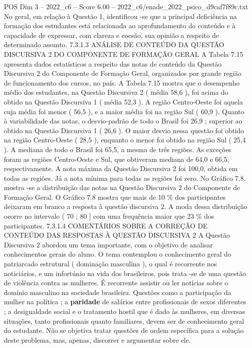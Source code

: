 \begin{textsample}{POS Dim 3 – 2022\_c6 – Score 6.00 – 2022\_c6/enade\_2022\_psico\_d9caf7f89c.txt}
No geral, em relação à Questão 1, identificou -se que a principal deficiência na formação dos estudantes está relacionada ao aprofundamento do conteúdo e à capacidade de expressar, com clareza e coesão, sua opinião a respeito de determinado assunto. 7.3.1.3 ANÁLISE DE CONTEÚDO DA QUESTÃO DISCURSIVA 2 DO COMPONENTE DE FORMAÇÃO GERAL A Tabela 7.15 apresenta dados estatísticos a respeito das notas de conteúdo da Questão Discursiva 2 do Componente de Formação Geral, organizados por grande região de funcionamento dos cursos, no país.
A Tabela 7.15 mostra que o desempenho médio dos estudantes, na Questão Discursiva 2 ( média 58,6 ), foi acima do obtido na Questão Discursiva 1 ( média 52,3 ).
A região Centro-Oeste foi aquela cuja média foi menor ( 56,5 ), e a maior média foi na região Sul ( 60,9 ).
Quanto à variabilidade das notas, o desvio-padrão de todo o Brasil foi 26,9 ; superior ao obtido na Questão Discursiva 1 ( 26,6 ).
O maior desvio nessa questão foi obtido na região Centro-Oeste ( 28,5 ), enquanto o menor foi obtido na região Sul ( 25,4 ).
A mediana de todo o Brasil foi 65,5, a mesma de três regiões.
As exceções foram as regiões Centro-Oeste e Sul, que obtiveram mediana de 64,0 e 66,5, respectivamente.
A nota máxima da Questão Discursiva 2 foi 100,0, obtida em todas as regiões.
Já a nota mínima para todas as regiões foi zero.
No Gráfico 7.8, mostra -se a distribuição das notas na Questão Discursiva 2 do Componente de Formação Geral.
O Gráfico 7.8 mostra que mais de 10 \% dos participantes deixaram em branco a resposta à questão discursiva 2.
A moda dessa distribuição ocorre no intervalo ( 70 ; 80 ] com uma frequência maior que 23 \% dos participantes. 7.3.1.4 COMENTÁRIOS SOBRE A CORREÇÃO DE CONTEÚDO DAS RESPOSTAS À QUESTÃO DISCURSIVA 2 A Questão Discursiva 2 abordou um tema importante, com o objetivo de analisar conhecimentos gerais do aluno.
O tema contemplou o conhecimento geral do patriarcado estrutural ( dominação masculina ), o qual é recorrente nos noticiários, e um infortúnio na vida dos brasileiros, pois trata -se de uma questão de violência contra as mulheres.
É recorrente assistir ou ler notícias sobre o domínio masculino na sociedade brasileira.
Questões como a participação da mulher na política ; a \textbf{paridade} de salários entre profissionais de sexos diferentes ; a desigualdade social e o tratamento hostil que é dado às mulheres, em diversas situações, tanto profissionais quanto familiares, devem ser de conhecimento geral do estudante.
Não se objetiva tratar questões de ordem específica para a solução deste problema, mas, apenas, discorrer e argumentar sobre ele.

\end{textsample}
